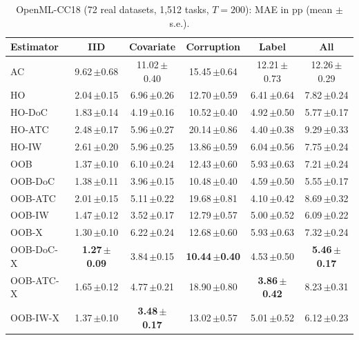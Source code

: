 \begin{table}[t]
\centering\small
\caption{OpenML-CC18 (72 real datasets, 1{,}512 tasks, $T=200$): MAE in pp (mean $\pm$ s.e.).}
\label{tab:openml}
\begin{tabular}{lccccc}
\toprule
Estimator & IID & Covariate & Corruption & Label & All\\
\midrule
AC & 9.62\,\scriptsize{$\pm$0.68} & 11.02\,\scriptsize{$\pm$0.40} & 15.45\,\scriptsize{$\pm$0.64} & 12.21\,\scriptsize{$\pm$0.73} & 12.26\,\scriptsize{$\pm$0.29} \\
HO & 2.04\,\scriptsize{$\pm$0.15} & 6.96\,\scriptsize{$\pm$0.26} & 12.70\,\scriptsize{$\pm$0.59} & 6.41\,\scriptsize{$\pm$0.64} & 7.82\,\scriptsize{$\pm$0.24} \\
HO\mbox{-}DoC & 1.83\,\scriptsize{$\pm$0.14} & 4.19\,\scriptsize{$\pm$0.16} & 10.52\,\scriptsize{$\pm$0.40} & 4.92\,\scriptsize{$\pm$0.50} & 5.77\,\scriptsize{$\pm$0.17} \\
HO\mbox{-}ATC & 2.48\,\scriptsize{$\pm$0.17} & 5.96\,\scriptsize{$\pm$0.27} & 20.14\,\scriptsize{$\pm$0.86} & 4.40\,\scriptsize{$\pm$0.38} & 9.29\,\scriptsize{$\pm$0.33} \\
HO\mbox{-}IW & 2.61\,\scriptsize{$\pm$0.20} & 5.96\,\scriptsize{$\pm$0.25} & 13.86\,\scriptsize{$\pm$0.59} & 6.04\,\scriptsize{$\pm$0.56} & 7.75\,\scriptsize{$\pm$0.24} \\
OOB & 1.37\,\scriptsize{$\pm$0.10} & 6.10\,\scriptsize{$\pm$0.24} & 12.43\,\scriptsize{$\pm$0.60} & 5.93\,\scriptsize{$\pm$0.63} & 7.21\,\scriptsize{$\pm$0.24} \\
OOB\mbox{-}DoC & 1.38\,\scriptsize{$\pm$0.11} & 3.96\,\scriptsize{$\pm$0.15} & 10.48\,\scriptsize{$\pm$0.40} & 4.59\,\scriptsize{$\pm$0.50} & 5.55\,\scriptsize{$\pm$0.17} \\
OOB\mbox{-}ATC & 2.01\,\scriptsize{$\pm$0.15} & 5.11\,\scriptsize{$\pm$0.22} & 19.68\,\scriptsize{$\pm$0.81} & 4.10\,\scriptsize{$\pm$0.42} & 8.69\,\scriptsize{$\pm$0.32} \\
OOB\mbox{-}IW & 1.47\,\scriptsize{$\pm$0.12} & 3.52\,\scriptsize{$\pm$0.17} & 12.79\,\scriptsize{$\pm$0.57} & 5.00\,\scriptsize{$\pm$0.52} & 6.09\,\scriptsize{$\pm$0.22} \\
OOB\mbox{-}X & 1.30\,\scriptsize{$\pm$0.10} & 6.22\,\scriptsize{$\pm$0.24} & 12.68\,\scriptsize{$\pm$0.60} & 5.93\,\scriptsize{$\pm$0.63} & 7.32\,\scriptsize{$\pm$0.24} \\
OOB\mbox{-}DoC\mbox{-}X & \textbf{1.27\,\scriptsize{$\pm$0.09}} & 3.84\,\scriptsize{$\pm$0.15} & \textbf{10.44\,\scriptsize{$\pm$0.40}} & 4.53\,\scriptsize{$\pm$0.50} & \textbf{5.46\,\scriptsize{$\pm$0.17}} \\
OOB\mbox{-}ATC\mbox{-}X & 1.65\,\scriptsize{$\pm$0.12} & 4.77\,\scriptsize{$\pm$0.21} & 18.90\,\scriptsize{$\pm$0.80} & \textbf{3.86\,\scriptsize{$\pm$0.42}} & 8.23\,\scriptsize{$\pm$0.31} \\
OOB\mbox{-}IW\mbox{-}X & 1.37\,\scriptsize{$\pm$0.10} & \textbf{3.48\,\scriptsize{$\pm$0.17}} & 13.02\,\scriptsize{$\pm$0.57} & 5.01\,\scriptsize{$\pm$0.52} & 6.12\,\scriptsize{$\pm$0.23} \\
\bottomrule
\end{tabular}
\end{table}

